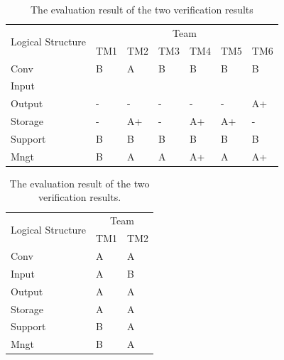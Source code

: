 \documentclass[a4paper,12pt]{jreport}
\begin{document}
\begin{table}[htbp]
  \centering
  \caption{The evaluation result of the two verification results}
    \begin{tabular}{|l|l|l|l|l|l|l|}
    \hline
    \multicolumn{1}{|c|}{\multirow{2}[4]{*}{Logical
Structure}} & \multicolumn{6}{c|}{Team} \bigstrut\\
\cline{2-7}          & TM1   & TM2   & TM3   & TM4   & TM5   & TM6 \bigstrut\\
    \hline
    Conv  & B     & A     & B     & B     & B     & B \bigstrut\\
    \hline
    Input &       &       &       &       &       &  \bigstrut\\
    \hline
    Output & -     & -     & -     & -     & -     & A+ \bigstrut\\
    \hline
    Storage & -     & A+    & -     & A+    & A+    & - \bigstrut\\
    \hline
    Support & B     & B     & B     & B     & B     & B \bigstrut[t]\\
    Mngt  & B     & A     & A     & A+    & A     & A+ \bigstrut[b]\\
    \hline
    \end{tabular}%
  \label{tbl:D-3-tbl5}%
\end{table}%

\begin{table}[htbp]
  \centering
  \caption{The evaluation result of the two verification results.}
    \begin{tabular}{|l|l|l|}
    \hline
    \multicolumn{1}{|c|}{\multirow{2}[4]{*}{Logical
Structure}} & \multicolumn{2}{c|}{Team} \bigstrut\\
\cline{2-3}          & TM1   & TM2 \bigstrut\\
    \hline
    Conv  & A     & A \bigstrut\\
    \hline
    Input & A     & B \bigstrut\\
    \hline
    Output & A     & A \bigstrut\\
    \hline
    Storage & A     & A \bigstrut\\
    \hline
    Support & B     & A \bigstrut\\
    \hline
    Mngt  & B     & A \bigstrut\\
    \hline
    \end{tabular}%
  \label{tbl:D-3-tbl6}%
\end{table}%
\end{document}
